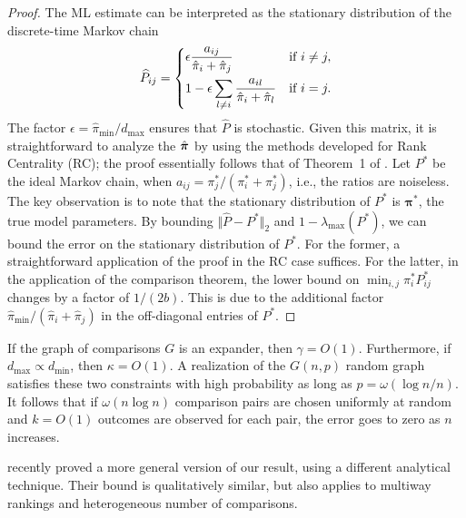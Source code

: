 \begin{proof}
The ML estimate can be interpreted as the stationary distribution of the discrete-time Markov chain
\begin{align}
\label{fix:eq:mlchain}
  \widehat{P}_{ij} =
  \begin{dcases}
    \epsilon \frac{a_{ij}}{\hat{\pi}_i + \hat{\pi}_j}                    & \text{if } i \ne j, \\
    1 - \epsilon \sum_{l \ne i} \frac{a_{il}}{\hat{\pi}_i + \hat{\pi}_l} & \text{if } i = j.
  \end{dcases}
\end{align}
The factor $\epsilon = \hat{\pi}_{\min} / d_{\max}$ ensures that $\widehat{P}$ is stochastic.
Given this matrix, it is straightforward to analyze the $\hat{\bm{\pi}}$ by using the methods developed for Rank Centrality (RC);
the proof essentially follows that of Theorem~1 of \citet{negahban2017rank}.
Let $P^*$ be the ideal Markov chain, when  $a_{ij} = \pi^*_j / (\pi^*_i + \pi^*_j)$, i.e., the ratios are noiseless.
The key observation is to note that the stationary distribution of $P^*$ is $\bm{\pi}^*$, the true model parameters.
By bounding $\Vert \widehat{P} - P^* \Vert_2$ and $1 - \lambda_{\max}(P^*)$, we can bound the error on the stationary distribution of $P^*$.
For the former, a straightforward application of the proof in the RC case suffices.
For the latter, in the application of the comparison theorem, the lower bound on $\min_{i,j} \pi^*_i P^*_{ij}$ changes by a factor of $1/(2b)$.
This is due to the additional factor $\hat{\pi}_{\min} / (\hat{\pi}_i + \hat{\pi}_j)$ in the off-diagonal entries of $P^*$.
\end{proof}

If the graph of comparisons $G$ is an expander, then $\gamma = O(1)$.
Furthermore, if $d_{\max} \propto d_{\min}$, then $\kappa = O(1)$.
A realization of the $G(n, p)$ random graph satisfies these two constraints with high probability as long as $p = \omega(\log n / n)$.
It follows that if $\omega(n \log n)$ comparison pairs are chosen uniformly at random and $k = O(1)$ outcomes are observed for each pair, the error goes to zero as $n$ increases.

\citet{hajek2014minimax} recently proved a more general version of our result, using a different analytical technique.
Their bound is qualitatively similar, but also applies to multiway rankings and heterogeneous number of comparisons.
